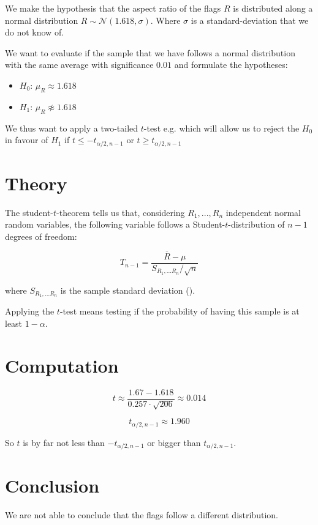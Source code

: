 \documentclass{article}
\begin{document}
We make the hypothesis that the aspect ratio of the flags $R$ is distributed along a normal distribution $R\sim {\mathcal{N}}(1.618,\sigma)$. Where $\sigma$ is a standard-deviation that we do not know of.

We want to evaluate if the sample that we have follows a normal distribution with the same average with significance $0.01$
and formulate the hypotheses:
\begin{itemize}
\item $H_0$: $\mu_R \approx 1.618$
\item $H_1$: $\mu_R \not\approx 1.618$
\end{itemize}

We thus want to apply a two-tailed $t$-test e.g. \cite[theorem 7.4.2]{Larsen-Marx} which will allow us
to reject the $H_0$ in favour of $H_1$ if $t\leqslant -t_{\alpha/2,n-1}$ or $t\geqslant t_{\alpha/2,n-1}$



\section{Theory}

The student-$t$-theorem tells us that, considering $R_1, ..., R_n$ independent normal random variables, the following
variable follows a Student-$t$-distribution of $n-1$ degrees of freedom:

$$T_{n-1}=\frac{\overline{R}-\mu}{S_{R_1,...R_n}/\sqrt{n}}$$

where $S_{R_1,...R_n}$ is the sample standard deviation (\cite{NIST-SEMATECH}).

Applying the $t$-test means testing if the probability of having this sample is at least $1-\alpha$.

\section{Computation}

$$t \approx \frac{1.67-1.618}{0.257\cdot\sqrt{206}} \approx 0.014$$

$$t_{\alpha/2,n-1} \approx 1.960$$

So $t$ is by far not less than $-t_{\alpha/2,n-1}$ or bigger than $t_{\alpha/2,n-1}$.



\section{Conclusion}

We are not able to conclude that the flags follow a different distribution.




\end{document}
